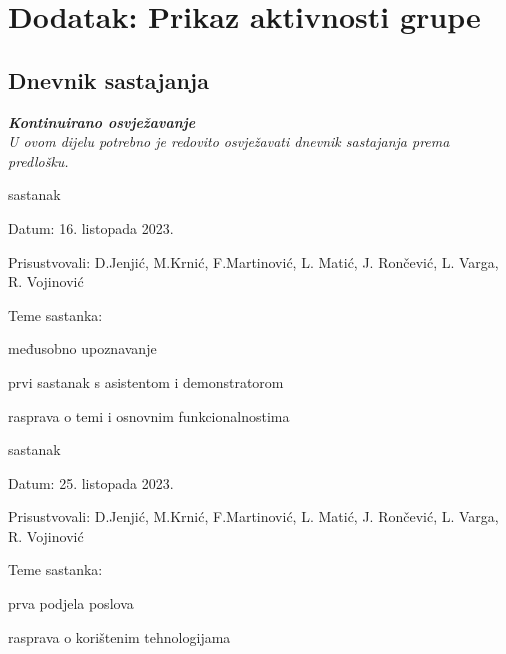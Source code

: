 \chapter*{Dodatak: Prikaz aktivnosti grupe}
		
		\section*{Dnevnik sastajanja}
		
		\textbf{\textit{Kontinuirano osvježavanje}}\\
		
		 \textit{U ovom dijelu potrebno je redovito osvježavati dnevnik sastajanja prema predlošku.}
		
		\begin{packed_enum}
			\item  sastanak
			
			\item[] \begin{packed_item}

				\item Datum: 16. listopada 2023.
				\item Prisustvovali: D.Jenjić, M.Krnić, F.Martinović, L. Matić, J. Rončević, L. Varga, R. Vojinović
				\item Teme sastanka:
				\begin{packed_item}
					\item  međusobno upoznavanje
					\item  prvi sastanak s asistentom i demonstratorom
					\item  rasprava o temi i osnovnim funkcionalnostima 
				\end{packed_item}
			\end{packed_item}
		
			
			\item  sastanak
			\item[] \begin{packed_item}
				\item Datum: 25. listopada 2023.
				\item Prisustvovali:  D.Jenjić, M.Krnić, F.Martinović, L. Matić, J. Rončević, L. Varga, R. Vojinović
				\item Teme sastanka:
				\begin{packed_item}
					\item  prva podjela poslova
					\item  rasprava o korištenim tehnologijama


\end{packed_item}
\end{packed_item}
\end{packed_enum}
